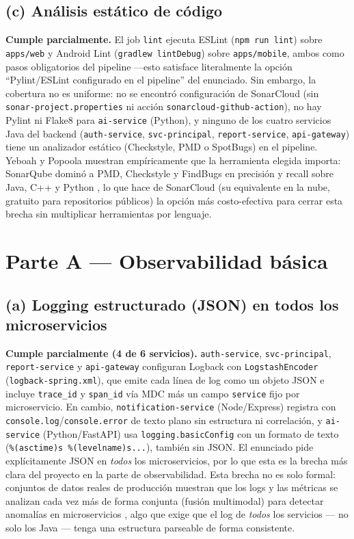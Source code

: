 \documentclass[11pt,letterpaper]{article}
\begin{document}
\subsection{(c) Análisis estático de código}
\textbf{Cumple parcialmente.} El job \texttt{lint} ejecuta ESLint (\texttt{npm run lint}) sobre \texttt{apps/web} y Android Lint (\texttt{gradlew lintDebug}) sobre \texttt{apps/mobile}, ambos como pasos obligatorios del pipeline —esto satisface literalmente la opción ``Pylint/ESLint configurado en el pipeline'' del enunciado. Sin embargo, la cobertura no es uniforme: no se encontró configuración de SonarCloud (sin \texttt{sonar-project.properties} ni acción \texttt{sonarcloud-github-action}), no hay Pylint ni Flake8 para \texttt{ai-service} (Python), y ninguno de los cuatro servicios Java del backend (\texttt{auth-service}, \texttt{svc-principal}, \texttt{report-service}, \texttt{api-gateway}) tiene un analizador estático (Checkstyle, PMD o SpotBugs) en el pipeline. Yeboah y Popoola muestran empíricamente que la herramienta elegida importa: SonarQube dominó a PMD, Checkstyle y FindBugs en precisión y recall sobre Java, C++ y Python \cite{yeboah2024static}, lo que hace de SonarCloud (su equivalente en la nube, gratuito para repositorios públicos) la opción más costo-efectiva para cerrar esta brecha sin multiplicar herramientas por lenguaje.

\section{Parte A --- Observabilidad básica}

\subsection{(a) Logging estructurado (JSON) en todos los microservicios}
\textbf{Cumple parcialmente (4 de 6 servicios).} \texttt{auth-service}, \texttt{svc-principal}, \texttt{report-service} y \texttt{api-gateway} configuran Logback con \texttt{LogstashEncoder} (\texttt{logback-spring.xml}), que emite cada línea de log como un objeto JSON e incluye \texttt{trace\_id} y \texttt{span\_id} vía MDC más un campo \texttt{service} fijo por microservicio. En cambio, \texttt{notification-service} (Node/Express) registra con \texttt{console.log}/\texttt{console.error} de texto plano sin estructura ni correlación, y \texttt{ai-service} (Python/FastAPI) usa \texttt{logging.basicConfig} con un formato de texto (\texttt{\%(asctime)s \%(levelname)s...}), también sin JSON. El enunciado pide explícitamente JSON en \emph{todos} los microservicios, por lo que esta es la brecha más clara del proyecto en la parte de observabilidad. Esta brecha no es solo formal: conjuntos de datos reales de producción muestran que los logs y las métricas se analizan cada vez más de forma conjunta (fusión multimodal) para detectar anomalías en microservicios \cite{bakhtin2025lo2}, algo que exige que el log de \emph{todos} los servicios --- no solo los Java --- tenga una estructura parseable de forma consistente.
\end{document}
